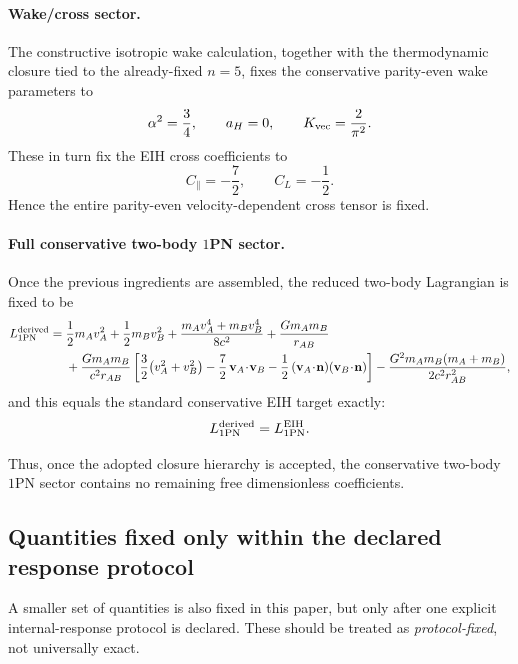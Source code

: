 \documentclass[11pt]{article}
\newcommand{\vct}{\mathbf v}
\newcommand{\nvec}{\mathbf n}
\begin{document}
\paragraph{Wake/cross sector.}
The constructive isotropic wake calculation, together with the thermodynamic closure tied
to the already-fixed \(n=5\), fixes the conservative parity-even wake parameters to
\begin{equation}
\alpha^2=\frac34,
\qquad
a_H=0,
\qquad
K_{\rm vec}=\frac{2}{\pi^2}.
\label{eq:fixed-wake-parameters}
\end{equation}
These in turn fix the EIH cross coefficients to
\begin{equation}
C_\parallel=-\frac72,
\qquad
C_L=-\frac12.
\label{eq:fixed-cross-coeffs}
\end{equation}
Hence the entire parity-even velocity-dependent cross tensor is fixed.

\paragraph{Full conservative two-body \(1\)PN sector.}
Once the previous ingredients are assembled, the reduced two-body Lagrangian is fixed to
be
\begin{align}
L_{\rm 1PN}^{\rm derived}
={}&
\frac12 m_A v_A^2 + \frac12 m_B v_B^2
+ \frac{m_A v_A^4 + m_B v_B^4}{8c^2}
+ \frac{Gm_A m_B}{r_{AB}}
\nonumber\\
&
+ \frac{Gm_A m_B}{c^2 r_{AB}}
\left[
\frac32\bigl(v_A^2+v_B^2\bigr)
-\frac72\,\vct_A\!\cdot\!\vct_B
-\frac12\,(\vct_A\!\cdot\!\nvec)(\vct_B\!\cdot\!\nvec)
\right]
- \frac{G^2m_A m_B(m_A+m_B)}{2c^2 r_{AB}^2},
\label{eq:fixed-full-eih}
\end{align}
and this equals the standard conservative EIH target exactly:
\begin{equation}
L_{\rm 1PN}^{\rm derived}=L_{\rm 1PN}^{\rm EIH}.
\label{eq:fixed-full-equality}
\end{equation}

Thus, once the adopted closure hierarchy is accepted, the conservative two-body \(1\)PN
sector contains no remaining free dimensionless coefficients.

\subsection{Quantities fixed only within the declared response protocol}
\label{sec:protocol-fixed}

A smaller set of quantities is also fixed in this paper, but only after one explicit
internal-response protocol is declared. These should be treated as \emph{protocol-fixed},
not universally exact.
\end{document}
